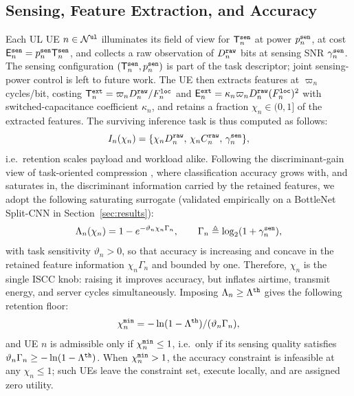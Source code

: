 \documentclass[journal]{IEEEtran}
\begin{document}
\subsection{Sensing, Feature Extraction, and Accuracy}
\label{sec:sense}
Each UL UE $n\in\mathcal{N}^{\tt ul}$ illuminates its field of view for $\mathsf{T}_n^{\tt sen}$ at power $p_n^{\tt sen}$, at cost $\mathsf{E}_n^{\tt sen}=p_n^{\tt sen}\mathsf{T}_n^{\tt sen}$, and collects a raw observation of $D_n^{\tt raw}$ bits at sensing SNR $\gamma_n^{\tt sen}$. The sensing configuration $(\mathsf{T}_n^{\tt sen},p_n^{\tt sen})$ is part of the task descriptor; joint sensing-power control is left to future work. The UE then extracts features at $\varpi_n$ cycles/bit, costing $\mathsf{T}_n^{\tt ext}=\varpi_n D_n^{\tt raw}/F_n^{\tt loc}$ and $\mathsf{E}_n^{\tt ext}=\kappa_n\varpi_n D_n^{\tt raw}(F_n^{\tt loc})^2$ with switched-capacitance coefficient $\kappa_n$, and retains a fraction $\chi_n\in(0,1]$ of the extracted features. The surviving inference task is thus computed as follows:
\begin{equation}
I_n(\chi_n)=\{\chi_n D_n^{\tt raw},\,\chi_n C_n^{\tt raw},\,\gamma_n^{\tt sen}\},
\label{eq:task}
\end{equation}
i.e.\ retention scales payload and workload alike. Following the discriminant-gain view of task-oriented compression \cite{wen2024iscc}, where classification accuracy grows with, and saturates in, the discriminant information carried by the retained features, we adopt the following saturating surrogate {\color{blue}(validated empirically on a BottleNet Split-CNN in Section~\ref{sec:results})}:
\begin{equation}
\Lambda_n(\chi_n)=1-e^{-\vartheta_n\chi_n \Gamma_n},
\qquad
\Gamma_n\triangleq\log_2(1+\gamma_n^{\tt sen}),
\label{eq:acc}
\end{equation}
with task sensitivity $\vartheta_n>0$, so that accuracy is increasing and concave in the retained feature information $\chi_n\Gamma_n$ and bounded by one. 
Therefore, $\chi_n$ is the single ISCC knob: raising it improves accuracy, but inflates airtime, transmit energy, and server cycles simultaneously. Imposing $\Lambda_n\ge\Lambda^{\tt th}$ gives the following retention floor:
\begin{equation}
\chi_n^{\tt min}=-\ln(1-\Lambda^{\tt th})/(\vartheta_n \Gamma_n),
\label{eq:chimin}
\end{equation}
and UE $n$ is admissible only if $\chi_n^{\tt min}\le 1$, i.e.\ only if its sensing quality satisfies $\vartheta_n \Gamma_n\ge-\ln(1-\Lambda^{\tt th})$. 
When $\chi_n^{\tt min}>1$, the accuracy constraint is infeasible at any $\chi_n\le1$; such UEs leave the constraint set, execute locally, and are assigned zero utility.
\end{document}
